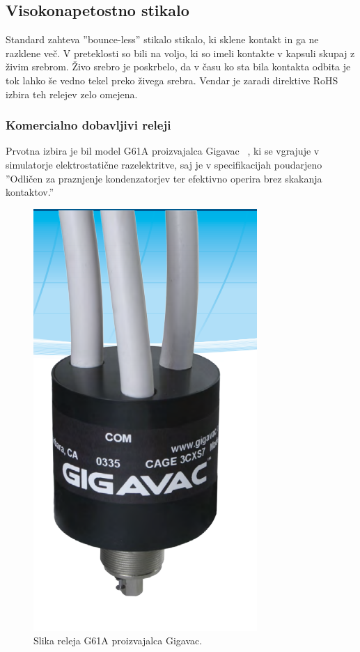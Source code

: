 \documentclass[a4paper,twoside,openright,12pt,Slovene]{book}
\begin{document}
	\subsection{Visokonapetostno stikalo} \label{Visokonapetostno stikalo}
	Standard zahteva ''bounce-less'' stikalo stikalo, ki sklene kontakt in ga ne razklene več. V preteklosti so bili na voljo, ki so imeli kontakte v kapsuli skupaj z živim srebrom. Živo srebro je poskrbelo, da v času ko sta bila kontakta odbita je tok lahko še vedno tekel preko živega srebra. Vendar je zaradi direktive RoHS izbira teh relejev zelo omejena.
	
	\subsubsection{Komercialno dobavljivi releji} \label{Komercialno dobavljivi releji}
     Prvotna izbira je bil model G61A proizvajalca Gigavac ~\cite{Gigavac:G61A}, ki se vgrajuje v simulatorje elektrostatične razelektritve, saj je v specifikacijah poudarjeno ''Odličen za praznjenje kondenzatorjev ter efektivno operira brez skakanja kontaktov.''
    
    \begin{figure}[H]
        \centering
        \includegraphics[width=0.5\columnwidth]{Slike/GigavacG61C.png}
        \caption{\label{GigavacG61C} Slika releja G61A proizvajalca Gigavac.}
    \end{figure}    
    
\end{document}
